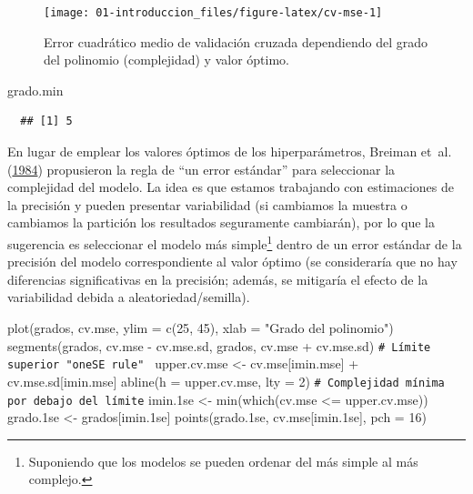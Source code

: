 \documentclass[
]{book}
\newenvironment{Shaded}{\begin{snugshade}}{\end{snugshade}}
\newcommand{\AttributeTok}[1]{\textcolor[rgb]{0.77,0.63,0.00}{#1}}
\newcommand{\CommentTok}[1]{\textcolor[rgb]{0.56,0.35,0.01}{\textit{#1}}}
\newcommand{\DecValTok}[1]{\textcolor[rgb]{0.00,0.00,0.81}{#1}}
\newcommand{\FloatTok}[1]{\textcolor[rgb]{0.00,0.00,0.81}{#1}}
\newcommand{\FunctionTok}[1]{\textcolor[rgb]{0.00,0.00,0.00}{#1}}
\newcommand{\NormalTok}[1]{#1}
\newcommand{\OtherTok}[1]{\textcolor[rgb]{0.56,0.35,0.01}{#1}}
\newcommand{\SpecialCharTok}[1]{\textcolor[rgb]{0.00,0.00,0.00}{#1}}
\newcommand{\StringTok}[1]{\textcolor[rgb]{0.31,0.60,0.02}{#1}}
\theoremstyle{break}
\theoremstyle{nonumberplain}
\renewcommand{\CommentTok}[1]{\textcolor[rgb]{0.41,0.41,0.41}{\texttt{#1}}}
\begin{document}
\begin{figure}[!htb]

{\centering \texttt{[image: 01-introduccion\_files/figure-latex/cv-mse-1]} 

}

\caption{Error cuadrático medio de validación cruzada dependiendo del grado del polinomio (complejidad) y valor óptimo.}\label{fig:cv-mse}
\end{figure}

\begin{Shaded}
\begin{Highlighting}[]
\NormalTok{grado.min}
\end{Highlighting}
\end{Shaded}

\begin{verbatim}
  ## [1] 5
\end{verbatim}

En lugar de emplear los valores óptimos de los hiperparámetros, Breiman et~al. (\protect\hyperlink{ref-breiman1984classification}{1984}) propusieron la regla de ``un error estándar'' para seleccionar la complejidad del modelo.
La idea es que estamos trabajando con estimaciones de la precisión y pueden presentar variabilidad (si cambiamos la muestra o cambiamos la partición los resultados seguramente cambiarán), por lo que la sugerencia es seleccionar el modelo más simple\footnote{Suponiendo que los modelos se pueden ordenar del más simple al más complejo.} dentro de un error estándar de la precisión del modelo correspondiente al valor óptimo (se consideraría que no hay diferencias significativas en la precisión; además, se mitigaría el efecto de la variabilidad debida a aleatoriedad/semilla).

\begin{Shaded}
\begin{Highlighting}[]
\FunctionTok{plot}\NormalTok{(grados, cv.mse, }\AttributeTok{ylim =} \FunctionTok{c}\NormalTok{(}\DecValTok{25}\NormalTok{, }\DecValTok{45}\NormalTok{),}
  \AttributeTok{xlab =} \StringTok{"Grado del polinomio"}\NormalTok{)}
\FunctionTok{segments}\NormalTok{(grados, cv.mse }\SpecialCharTok{{-}}\NormalTok{ cv.mse.sd, grados, cv.mse }\SpecialCharTok{+}\NormalTok{ cv.mse.sd)}
\CommentTok{\# Límite superior "oneSE rule" }
\NormalTok{upper.cv.mse }\OtherTok{\textless{}{-}}\NormalTok{ cv.mse[imin.mse] }\SpecialCharTok{+}\NormalTok{ cv.mse.sd[imin.mse]}
\FunctionTok{abline}\NormalTok{(}\AttributeTok{h =}\NormalTok{ upper.cv.mse, }\AttributeTok{lty =} \DecValTok{2}\NormalTok{)}
\CommentTok{\# Complejidad mínima por debajo del límite}
\NormalTok{imin}\FloatTok{.1}\NormalTok{se }\OtherTok{\textless{}{-}} \FunctionTok{min}\NormalTok{(}\FunctionTok{which}\NormalTok{(cv.mse }\SpecialCharTok{\textless{}=}\NormalTok{ upper.cv.mse))}
\NormalTok{grado}\FloatTok{.1}\NormalTok{se }\OtherTok{\textless{}{-}}\NormalTok{ grados[imin}\FloatTok{.1}\NormalTok{se]}
\FunctionTok{points}\NormalTok{(grado}\FloatTok{.1}\NormalTok{se, cv.mse[imin}\FloatTok{.1}\NormalTok{se], }\AttributeTok{pch =} \DecValTok{16}\NormalTok{)}
\end{Highlighting}
\end{Shaded}
\end{document}
